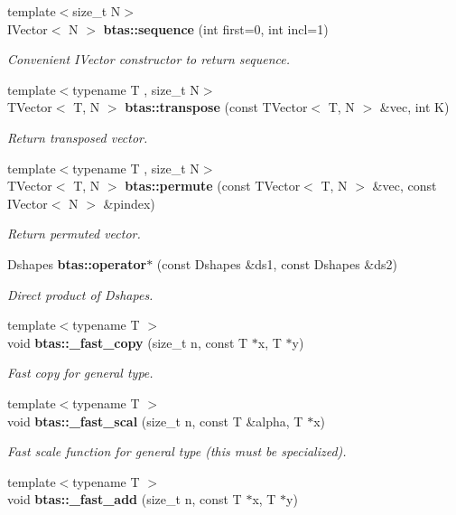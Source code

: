 \begin{DoxyCompactItemize}
{\footnotesize template$<$size\-\_\-t N$>$ }\\I\-Vector$<$ N $>$ {\bf btas\-::sequence} (int first=0, int incl=1)
\begin{DoxyCompactList}\small\item\em Convenient I\-Vector constructor to return sequence. \end{DoxyCompactList}\item 
{\footnotesize template$<$typename T , size\-\_\-t N$>$ }\\T\-Vector$<$ T, N $>$ {\bf btas\-::transpose} (const T\-Vector$<$ T, N $>$ \&vec, int K)
\begin{DoxyCompactList}\small\item\em Return transposed vector. \end{DoxyCompactList}\item 
{\footnotesize template$<$typename T , size\-\_\-t N$>$ }\\T\-Vector$<$ T, N $>$ {\bf btas\-::permute} (const T\-Vector$<$ T, N $>$ \&vec, const I\-Vector$<$ N $>$ \&pindex)
\begin{DoxyCompactList}\small\item\em Return permuted vector. \end{DoxyCompactList}\item 
Dshapes {\bf btas\-::operator$\ast$} (const Dshapes \&ds1, const Dshapes \&ds2)
\begin{DoxyCompactList}\small\item\em Direct product of Dshapes. \end{DoxyCompactList}\item 
{\footnotesize template$<$typename T $>$ }\\void {\bf btas\-::\-\_\-fast\-\_\-copy} (size\-\_\-t n, const T $\ast$x, T $\ast$y)
\begin{DoxyCompactList}\small\item\em Fast copy for general type. \end{DoxyCompactList}\item 
{\footnotesize template$<$typename T $>$ }\\void {\bf btas\-::\-\_\-fast\-\_\-scal} (size\-\_\-t n, const T \&alpha, T $\ast$x)
\begin{DoxyCompactList}\small\item\em Fast scale function for general type (this must be specialized). \end{DoxyCompactList}\item 
{\footnotesize template$<$typename T $>$ }\\void {\bf btas\-::\-\_\-fast\-\_\-add} (size\-\_\-t n, const T $\ast$x, T $\ast$y)

\end{DoxyCompactItemize}
